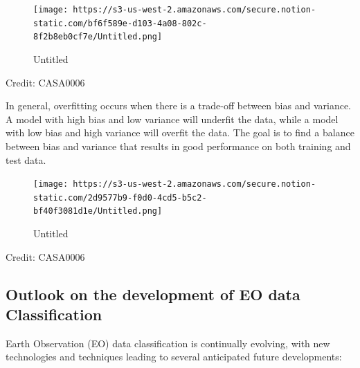 \documentclass[
  letterpaper,
  DIV=11,
  numbers=noendperiod]{scrreprt}
\begin{document}
\begin{figure}

{\centering \texttt{[image: https://s3-us-west-2.amazonaws.com/secure.notion-static.com/bf6f589e-d103-4a08-802c-8f2b8eb0cf7e/Untitled.png]}

}

\caption{Untitled}

\end{figure}

Credit: CASA0006

In general, overfitting occurs when there is a trade-off between bias
and variance. A model with high bias and low variance will underfit the
data, while a model with low bias and high variance will overfit the
data. The goal is to find a balance between bias and variance that
results in good performance on both training and test data.

\begin{figure}

{\centering \texttt{[image: https://s3-us-west-2.amazonaws.com/secure.notion-static.com/2d9577b9-f0d0-4cd5-b5c2-bf40f3081d1e/Untitled.png]}

}

\caption{Untitled}

\end{figure}

Credit: CASA0006

\hypertarget{outlook-on-the-development-of-eo-data-classification}{%
\subsection{Outlook on the development of EO data
Classification}\label{outlook-on-the-development-of-eo-data-classification}}

Earth Observation (EO) data classification is continually evolving, with
new technologies and techniques leading to several anticipated future
developments:
\end{document}
